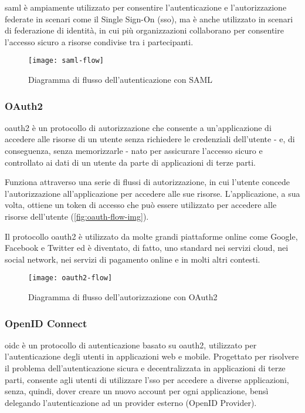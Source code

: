 \acrshort{saml} è ampiamente utilizzato per consentire l'autenticazione e l'autorizzazione federate in scenari come il Single Sign-On (\acrshort{sso}), ma è anche utilizzato in scenari di federazione di identità, in cui più organizzazioni collaborano per consentire l'accesso sicuro a risorse condivise tra i partecipanti.
\begin{figure}[H] 
    \centering 
    \texttt{[image: saml-flow]} 
    \caption{Diagramma di flusso dell'autenticazione con SAML}
    \label{fig:saml-flow}
\end{figure}

\subsubsection{OAuth2}
\acrshort{oauth2}\cite{site:what-is-oauth} è un protocollo di autorizzazione che consente a un'applicazione di accedere alle risorse di un utente senza richiedere le credenziali dell'utente - e, di conseguenza, senza memorizzarle - nato per assicurare l'accesso sicuro e controllato ai dati di un utente da parte di applicazioni di terze parti.

Funziona attraverso una serie di flussi di autorizzazione, in cui l'utente concede l'autorizzazione all'applicazione per accedere alle sue risorse. L'applicazione, a sua volta, ottiene un token di accesso che può essere utilizzato per accedere alle risorse dell'utente (\autoref{fig:oauth-flow-img}).

Il protocollo \acrshort{oauth2} è utilizzato da molte grandi piattaforme online come Google, Facebook e Twitter ed è diventato, di fatto, uno standard nei servizi cloud, nei social network, nei servizi di pagamento online e in molti altri contesti.
\begin{figure}[H] 
    \centering 
    \texttt{[image: oauth2-flow]} 
    \caption{Diagramma di flusso dell'autorizzazione con OAuth2}
    \label{fig:oauth-flow-img}
\end{figure}

\subsubsection{OpenID Connect}
\acrshort{oidc}\cite{site:oidc} è un protocollo di autenticazione basato su \acrshort{oauth2}, utilizzato per l'autenticazione degli utenti in applicazioni web e mobile. Progettato per risolvere il problema dell'autenticazione sicura e decentralizzata in applicazioni di terze parti, consente agli utenti di utilizzare l'\acrshort{sso} per accedere a diverse applicazioni, senza, quindi, dover creare un nuovo account per ogni applicazione, bensì delegando l'autenticazione ad un provider esterno (OpenID Provider).

